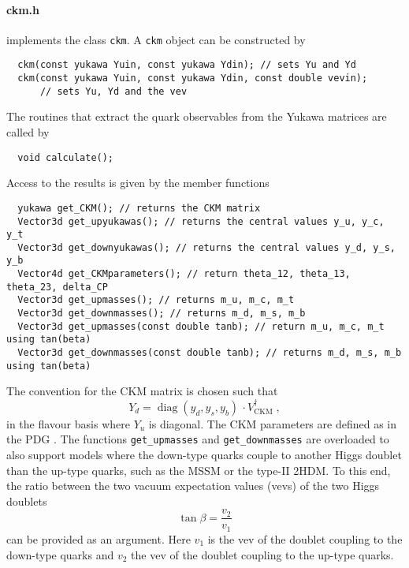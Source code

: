 \documentclass[11pt,a4paper]{article}
\begin{document}
\paragraph{ckm.h}
implements the class \texttt{ckm}.
A \texttt{ckm} object can be constructed by
\begin{lstlisting}
  ckm(const yukawa Yuin, const yukawa Ydin); // sets Yu and Yd
  ckm(const yukawa Yuin, const yukawa Ydin, const double vevin);
      // sets Yu, Yd and the vev
\end{lstlisting}
The routines that extract the quark observables from the Yukawa matrices are called by
\begin{lstlisting}
  void calculate();
\end{lstlisting}
Access to the results is given by the member functions
\begin{lstlisting}
  yukawa get_CKM(); // returns the CKM matrix
  Vector3d get_upyukawas(); // returns the central values y_u, y_c, y_t
  Vector3d get_downyukawas(); // returns the central values y_d, y_s, y_b
  Vector4d get_CKMparameters(); // return theta_12, theta_13, theta_23, delta_CP
  Vector3d get_upmasses(); // returns m_u, m_c, m_t
  Vector3d get_downmasses(); // returns m_d, m_s, m_b
  Vector3d get_upmasses(const double tanb); // return m_u, m_c, m_t using tan(beta)
  Vector3d get_downmasses(const double tanb); // returns m_d, m_s, m_b using tan(beta)
\end{lstlisting}
The convention for the CKM matrix is chosen such that
\begin{equation}
  Y_d = \operatorname{diag}(y_d,y_s,y_b)\,\cdot V_{\mathrm{CKM}}^\dagger\;,
\end{equation}
in the flavour basis where $Y_u$ is diagonal. The CKM parameters are defined as in the PDG \cite{Patrignani:2016xqp}.
The functions \verb|get_upmasses| and \verb|get_downmasses| are overloaded to also support models where the down-type quarks couple to another Higgs doublet than the up-type quarks,
such as the MSSM or the type-II 2HDM. To this end, the ratio between the two vacuum expectation values (vevs) of the two Higgs doublets
\begin{equation}
\tan\beta = \frac{v_2}{v_1}
\end{equation}
can be provided as an argument. Here $v_1$ is the vev of the doublet coupling to the down-type quarks and $v_2$ the vev of the doublet coupling to the up-type quarks.
\end{document}
